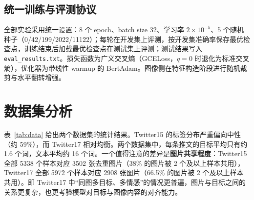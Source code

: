\documentclass[11pt]{ctexart}
\begin{document}
\subsection{统一训练与评测协议}

全部实验采用统一设置：8 个 epoch、batch size 32、学习率 $2\times10^{-5}$、5 个随机种子（0/42/199/2022/11122）；每轮在开发集上评测，按开发集准确率保存最优检查点，训练结束后加载最优检查点在测试集上评测；测试结果写入 \texttt{eval\_results.txt}。损失函数为广义交叉熵（GCELoss，$q=0$ 时退化为标准交叉熵），优化器为带线性 warmup 的 BertAdam。图像侧在特征构造阶段进行随机裁剪与水平翻转增强。

\section{数据集分析}\label{sec:data}

表~\ref{tab:data} 给出两个数据集的统计结果。Twitter15 的标签分布严重偏向中性（约 59\%），而 Twitter17 相对均衡。两个数据集中，每条推文的目标平均只有约 1.6 个词，文本平均约 16 个词。一个值得注意的差异是\textbf{图片共享程度}：Twitter15 全部 5338 个样本对应 3502 张去重图片（38\% 的图片被 2 个及以上样本共用），Twitter17 全部 5972 个样本对应 2908 张图片（66.5\% 的图片被 2 个及以上样本共用）。即 Twitter17 中“同图多目标、多情感”的情况更普遍，图片与目标之间的关系更复杂，也更考验模型对目标与图像内容的对齐能力。

\begin{table}[htbp]
\centering
\caption{Twitter15 / Twitter17 数据集统计}\label{tab:data}
\footnotesize
{}
\caption*{\footnotesize 注：多数类基线（全部预测中性）在 Twitter15 / Twitter17 测试集上的准确率分别为 58.53\% 与 46.43\%。文本平均约 16 词，未列入表中。}
\end{table}
\end{document}
